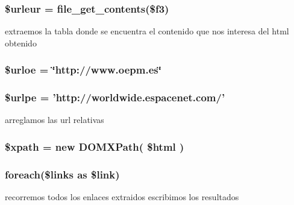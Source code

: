 \hypertarget{accion_8php_afa50febb675e5f19e9013510de218de5}{
\subsubsection[{\$urleur}]{\setlength{\rightskip}{0pt plus 5cm}\$urleur = file\-\_\-get\-\_\-contents(\$f3)}}\label{accion_8php_afa50febb675e5f19e9013510de218de5}
extraemos la tabla donde se encuentra el contenido que nos interesa del html obtenido \hypertarget{accion_8php_a081efab717c24c5b35e1c7b5d7f9a0d7}{
\subsubsection[{\$urloe}]{\setlength{\rightskip}{0pt plus 5cm}\$urloe = \char`\"{}http\-://www.\-oepm.\-es\char`\"{}}}\label{accion_8php_a081efab717c24c5b35e1c7b5d7f9a0d7}
\hypertarget{accion_8php_a8d0580b4daa45d2b3b97109ff02e6b65}{
\subsubsection[{\$urlpe}]{\setlength{\rightskip}{0pt plus 5cm}\$urlpe = 'http\-://worldwide.\-espacenet.\-com/'}}\label{accion_8php_a8d0580b4daa45d2b3b97109ff02e6b65}
arreglamos las url relativas \hypertarget{accion_8php_aa270f2ef637ad3d6465f2b764c046def}{
\subsubsection[{\$xpath}]{\setlength{\rightskip}{0pt plus 5cm}\$xpath = new D\-O\-M\-X\-Path( \$html )}}\label{accion_8php_aa270f2ef637ad3d6465f2b764c046def}
\hypertarget{accion_8php_ae49e2d63f3c0e66b857f6c514a361000}{
\subsubsection[{foreach}]{\setlength{\rightskip}{0pt plus 5cm}foreach(\$links as \$link)}}\label{accion_8php_ae49e2d63f3c0e66b857f6c514a361000}
recorremos todos los enlaces extraidos escribimos los resultados 